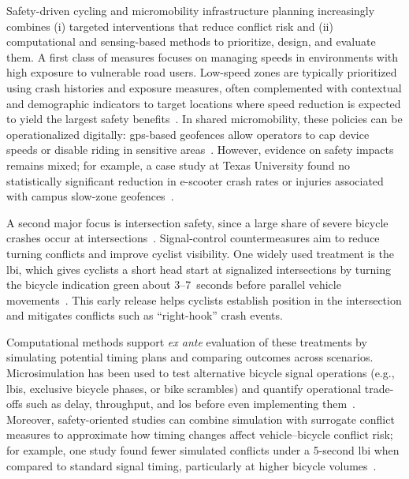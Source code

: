     Safety-driven cycling and micromobility infrastructure planning increasingly combines (i) targeted interventions that reduce conflict risk and (ii) computational and sensing-based methods to prioritize, design, and evaluate them. A first class of measures focuses on managing speeds in environments with high exposure to vulnerable road users. Low-speed zones are typically prioritized using crash histories and exposure measures, often complemented with contextual and demographic indicators to target locations where speed reduction is expected to yield the largest safety benefits~\cite{GRSF_LSZGuide}. In shared micromobility, these policies can be operationalized digitally: \ac{gps}-based geofences allow operators to cap device speeds or disable riding in sensitive areas~\cite{Hall2024, ChargeAndGo2025}. However, evidence on safety impacts remains mixed; for example, a case study at Texas University found no statistically significant reduction in e-scooter crash rates or injuries associated with campus slow-zone geofences~\cite{Hall2024}.

    A second major focus is intersection safety, since a large share of severe bicycle crashes occur at intersections~\cite{KeitaShindgikar2024, Alluri2017}. Signal-control countermeasures aim to reduce turning conflicts and improve cyclist visibility. One widely used treatment is the \ac{lbi}, which gives cyclists a short head start at signalized intersections by turning the bicycle indication green about 3--7~seconds before parallel vehicle movements~\cite{KeitaShindgikar2024}. This early release helps cyclists establish position in the intersection and mitigates conflicts such as ``right-hook'' crash events.

    Computational methods support \emph{ex ante} evaluation of these treatments by simulating potential timing plans and comparing outcomes across scenarios. Microsimulation has been used to test alternative bicycle signal operations (e.g., \acp{lbi}, exclusive bicycle phases, or bike scrambles) and quantify operational trade-offs such as delay, throughput, and \ac{los} before even implementing them~\cite{Kothuri2018}. Moreover, safety-oriented studies can combine simulation with surrogate conflict measures to approximate how timing changes affect vehicle--bicycle conflict risk; for example, one study found fewer simulated conflicts under a 5-second \ac{lbi} when compared to standard signal timing, particularly at higher bicycle volumes~\cite{Oh2018}.

